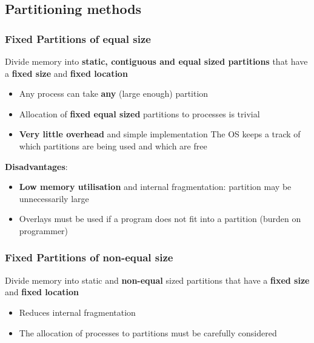 \documentclass{article}
\begin{document}
\subsection{Partitioning methods}
\subsubsection{Fixed Partitions of equal size}
\begin{flushleft}
Divide memory into \textbf{static, contiguous and equal sized partitions} that have a \textbf{fixed size} and \textbf{fixed location}
\begin{itemize}
	\item Any process can take \textbf{any} (large enough) partition
	\item Allocation of \textbf{fixed equal sized} partitions to processes is trivial
	\item \textbf{Very little overhead} and simple implementation The OS keeps a track of which partitions are being used and which are free
\end{itemize}
\textbf{Disadvantages}:
\begin{itemize}
	\item \textbf{Low memory utilisation} and internal fragmentation: partition may be unnecessarily large
	\item Overlays must be used if a program does not fit into a partition (burden on programmer)
\end{itemize}
\end{flushleft}

\subsubsection{Fixed Partitions of non-equal size}
\begin{flushleft}
Divide memory into static and \textbf{non-equal} sized partitions that have a \textbf{fixed size} and \textbf{fixed location}
\begin{itemize}
	\item Reduces internal fragmentation
	\item The allocation of processes to partitions must be carefully considered
\end{itemize}
\end{flushleft}
\end{document}
